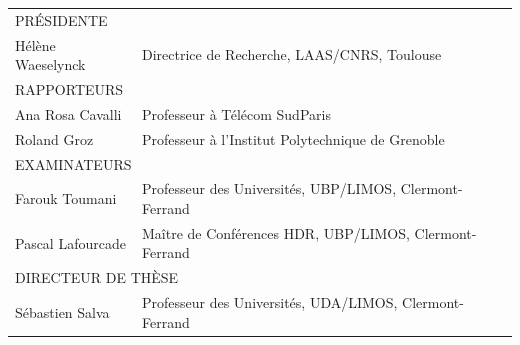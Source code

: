 \begin{titlepage}
    \begin{tabular}{l l}
    \multicolumn{2}{l}{\uppercase{Présidente}}\\
    Hélène Waeselynck & Directrice de Recherche, LAAS/CNRS, Toulouse\\
    \multicolumn{2}{l}{\uppercase{Rapporteurs}}\\
    Ana Rosa Cavalli & Professeur à Télécom SudParis\\
    Roland Groz & Professeur à l'Institut Polytechnique de Grenoble\\
    \multicolumn{2}{l}{\uppercase{Examinateurs}}\\
    Farouk Toumani & Professeur des Universités, UBP/LIMOS, Clermont-Ferrand\\
    Pascal Lafourcade & Maître de Conférences HDR, UBP/LIMOS, Clermont-Ferrand\\
    \multicolumn{2}{l}{\uppercase{Directeur de thèse}}\\
    S\'ebastien Salva & Professeur des Universités, UDA/LIMOS, Clermont-Ferrand\\
    \end{tabular}

\end{titlepage}
